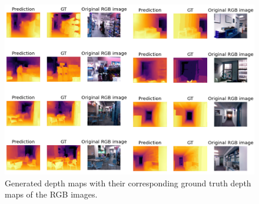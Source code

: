 \documentclass[a4paper,12pt,oneside]{book}
\begin{document}
\begin{figure}[!hbtp]
\centering
\includegraphics[width=1\textwidth]{Figures/result.png}
\captionsetup{font=small}
\caption{Generated depth maps with their corresponding ground truth depth maps of the RGB images.}
\label{fig:out}
\end{figure}
\newpage
\end{document}
